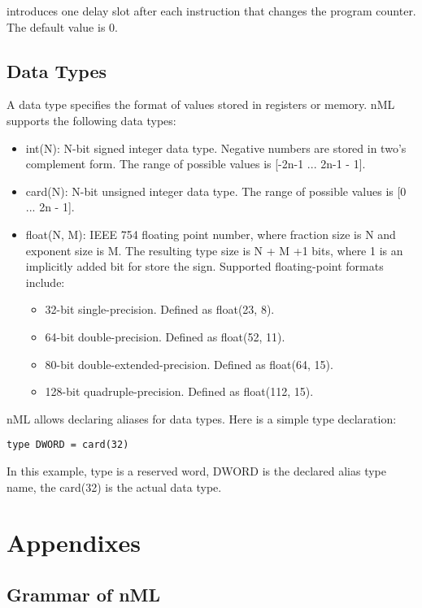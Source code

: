 \documentclass[oneside,final,14pt]{extreport}
\begin{document}
introduces one delay slot after each instruction that changes the program counter. The default
value is 0.

\section{Data Types}

A data type specifies the format of values stored in registers or memory. nML supports
the following data types: 

\begin{itemize}

\item int(N): N-bit signed integer data type. Negative numbers are stored in two's 
complement form. The range of possible values is [-2n-1 ... 2n-1 - 1].

\item card(N): N-bit unsigned integer data type. The range of possible values is [0 ... 2n - 1].

\item float(N, M): IEEE 754 floating point number, where fraction size is N and exponent size is M.
The resulting type size is N + M +1 bits, where 1 is an implicitly added bit for store the sign.
Supported floating-point formats include:

\begin{itemize}
\item 32-bit single-precision. Defined as float(23, 8).
\item 64-bit double-precision. Defined as float(52, 11).
\item 80-bit double-extended-precision. Defined as float(64, 15).
\item 128-bit quadruple-precision. Defined as float(112, 15).
\end{itemize}

\end{itemize}

nML allows declaring aliases for data types. Here is a simple type declaration:

\begin{lstlisting}
type DWORD = card(32)
\end{lstlisting}

In this example, type is a reserved word, DWORD is the declared alias type name, the card(32) is
the actual data type.




\chapter{Appendixes}

\section{Grammar of nML}
\end{document}
